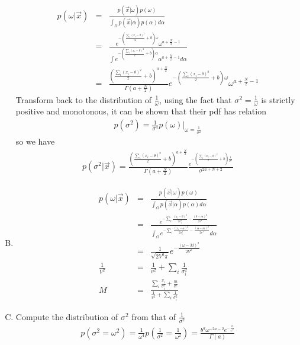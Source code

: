 \documentclass{article}
\begin{document}
\begin{enumerate}[(A)]
\begin{eqnarray}
p(\omega|\vec{x})&=&\frac{p(\vec{x}|\omega)p(\omega)}{\int_{\Omega}p(\vec{x}|\alpha)p(\alpha)d\alpha}\nonumber\\
&=&\frac{e^{-(\frac{\sum_i(x_i-\theta)^2}{2}+b)\omega}\omega^{a+\frac{N}{2}-1}}{\int e^{-(\frac{\sum_i(x_i-\theta)^2}{2}+b)\alpha}\alpha^{a+\frac{N}{2}-1}d\alpha}\nonumber\\
&=&\frac{(\frac{\sum_i(x_i-\theta)^2}{2}+b)^{a+\frac{N}{2}}}{\Gamma(a+\frac{N}{2})}e^{-(\frac{\sum_i(x_i-\theta)^2}{2}+b)\omega}\omega^{a+\frac{N}{2}-1}
\end{eqnarray}
Transform back to the distribution of $\frac{1}{\omega}$, using the fact that $\sigma^2=\frac{1}{\omega}$ is strictly positive and monotonous, it can be shown that their pdf has relation
\begin{eqnarray}
p(\sigma^2)=\frac{1}{\sigma^4}p(\omega)|_{\omega=\frac{1}{\sigma^2}}
\end{eqnarray}
so we have
\begin{eqnarray}
p(\sigma^2|\vec{x})=\frac{(\frac{\sum_i(x_i-\theta)^2}{2}+b)^{a+\frac{N}{2}}}{\Gamma(a+\frac{N}{2})}\frac{e^{-(\frac{\sum_i(x_i-\theta)^2}{2}+b)\frac{1}{\sigma^2}}}{\sigma^{2a+N+2}}
\end{eqnarray}

\item

\begin{eqnarray}
p(\omega|\vec{x})&=&\frac{p(\vec{x}|\omega)p(\omega)}{\int_{\Omega}p(\vec{x}|\alpha)p(\alpha)d\alpha}\nonumber\\
&=&\frac{e^{-\sum_i\frac{(x_i-\theta)^2}{2\sigma_i^2}-\frac{(\theta-m)^2}{2v^2}}}{\int_{\Omega} e^{-\sum_i\frac{(x_i-\alpha)^2}{2\sigma_i^2}-\frac{(\alpha-m)^2}{2v^2}}d\alpha}\nonumber\\
&=&\frac{1}{\sqrt{2V^2\pi}}e^{-\frac{(\omega-M)^2}{2V^2}}\\
\frac{1}{V^2}&=&\frac{1}{v^2}+\sum_i\frac{1}{\sigma_i^2}\\
M&=&\frac{\sum_i\frac{x_i}{\sigma_i^2}+\frac{m}{v^2}}{\frac{1}{v^2}+\sum_i\frac{1}{\sigma_i^2}}
\end{eqnarray}

\item

Compute the distribution of $\sigma^2$ from that of $\frac{1}{\sigma^2}$
\begin{eqnarray}
p(\sigma^2=\omega^2)=\frac{1}{\omega^4}p(\frac{1}{\sigma^2}=\frac{1}{\omega^2})=\frac{b^a\omega^{-2a-2}e^{-\frac{b}{\omega^2}}}{\Gamma(a)}
\end{eqnarray}


\end{enumerate}
\end{document}
